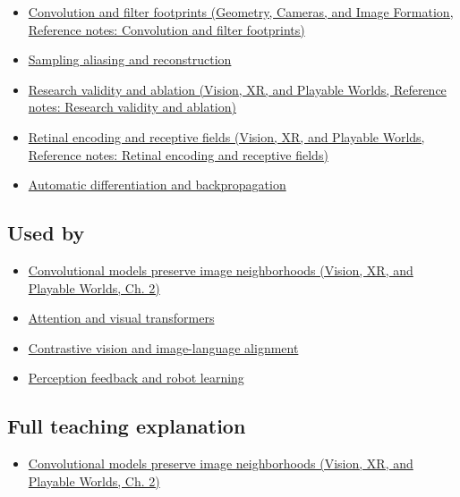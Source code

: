 \begin{itemize}
\tightlist
\item
  \href{../03-Geometry-Cameras-and-Image-Formation/main.pdf\#nameddest=appendix-d5b3c692d9f0}{Convolution and filter footprints (Geometry, Cameras, and Image Formation, Reference notes: Convolution and filter footprints)}
\item
  \hyperref[appendix-6a7869dd79a6]{Sampling aliasing and reconstruction}
\item
  \href{../07-Vision-XR-and-Playable-Worlds/main.pdf\#nameddest=appendix-65788587ef78}{Research validity and ablation (Vision, XR, and Playable Worlds, Reference notes: Research validity and ablation)}
\item
  \href{../07-Vision-XR-and-Playable-Worlds/main.pdf\#nameddest=appendix-7281c15ac44a}{Retinal encoding and receptive fields (Vision, XR, and Playable Worlds, Reference notes: Retinal encoding and receptive fields)}
\item
  \hyperref[appendix-40df0855b4a7]{Automatic differentiation and backpropagation}
\end{itemize}

\subsection{Used by}\label{appendix-47c51ea026fb-used-by}

\begin{itemize}
\tightlist
\item
  \href{../07-Vision-XR-and-Playable-Worlds/main.pdf\#nameddest=04-visual-computing-ii-ch031-convolutional-models-preserve-image-neighborhoods}{Convolutional models preserve image neighborhoods (Vision, XR, and Playable Worlds, Ch. 2)}
\item
  \hyperref[appendix-a9d5dfdd164a]{Attention and visual transformers}
\item
  \hyperref[appendix-772f1fd96148]{Contrastive vision and image-language alignment}
\item
  \hyperref[appendix-b0c42da325f1]{Perception feedback and robot learning}
\end{itemize}

\subsection{Full teaching explanation}\label{appendix-47c51ea026fb-full-teaching-explanation}

\begin{itemize}
\tightlist
\item
  \href{../07-Vision-XR-and-Playable-Worlds/main.pdf\#nameddest=04-visual-computing-ii-ch031-convolutional-models-preserve-image-neighborhoods}{Convolutional models preserve image neighborhoods (Vision, XR, and Playable Worlds, Ch. 2)}
\end{itemize}


